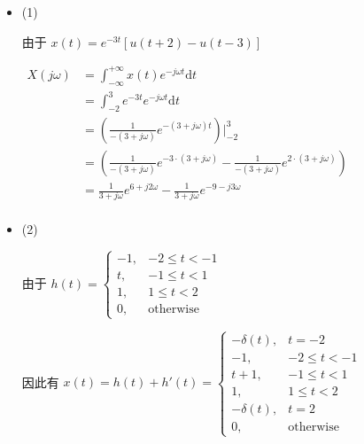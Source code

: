 \documentclass[a4paper,UTF8]{article}
\numberwithin{equation}{section}
\begin{document}
\begin{framed}
\begin{spacing}{1.5}
    \begin{itemize}
      \item (1)

      由于 $x(t) = e^{-3t}[u(t+2)-u(t-3)]$
      
      $
      \begin{aligned}
      X(j\omega) &= \int_{-\infty}^{+\infty}x(t)e^{-j\omega t}\mathrm{d}t  \\
      &= \int_{-2}^{3}e^{-3t}e^{-j\omega t}\mathrm{d}t  \\
      &= (\frac{1}{-(3+j\omega)}e^{-(3+j\omega) t})|_{-2}^{3}  \\
      &= (\frac{1}{-(3+j\omega)}e^{-3\cdot (3+j\omega)} - \frac{1}{-(3+j\omega)}e^{2\cdot (3+j\omega)})  \\
      &= \frac{1}{3+j\omega}e^{6+j 2\omega} - \frac{1}{3+j\omega}e^{-9-j 3\omega}  \\
      \end{aligned}
      $
      
      \item (2)
      
      由于 $h(t) = \begin{cases}
          -1, & -2 \le t < -1  \\
          t, & -1 \le t < 1  \\
          1, & 1 \le t < 2  \\
          0, & \text{otherwise}
      \end{cases}$
      
      因此有 $x(t) = h(t) + h'(t) = \begin{cases}
          -\delta(t), & t = -2  \\
          -1, & -2 \le t < -1  \\
          t + 1, & -1 \le t < 1  \\
          1, & 1 \le t < 2  \\
          -\delta(t), & t = 2  \\
          0, & \text{otherwise}
      \end{cases}$
      

\end{itemize}
\end{spacing}
\end{framed}
\end{document}
